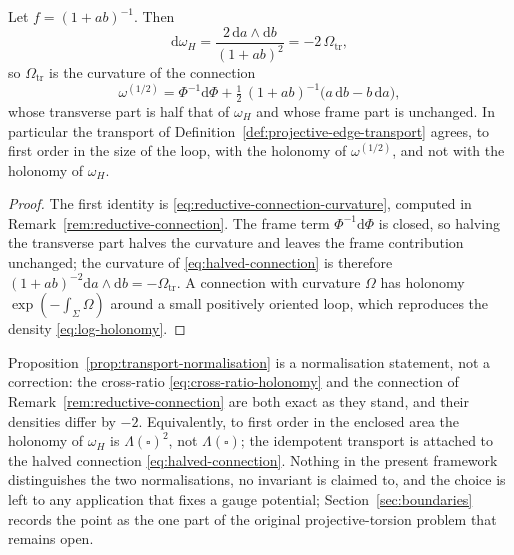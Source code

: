 \begin{proposition}
\label{prop:transport-normalisation}
Let $f=(1+ab)^{-1}$.  Then
\begin{equation}\label{eq:connection-curvature}
  \mathrm d\omega_H
  =\frac{2\,\mathrm da\wedge\mathrm db}{(1+ab)^{2}}
  =-2\,\Omega_{\mathrm{tr}} ,
\end{equation}
so $\Omega_{\mathrm{tr}}$ is the curvature of the connection
\begin{equation}\label{eq:halved-connection}
  \omega^{(1/2)}=\Phi^{-1}\mathrm d\Phi+\tfrac12\,(1+ab)^{-1}
  \bigl(a\,\mathrm db-b\,\mathrm da\bigr),
\end{equation}
whose transverse part is half that of $\omega_H$ and whose frame part is
unchanged.  In particular the transport of
Definition~\ref{def:projective-edge-transport} agrees, to first order in the
size of the loop, with the holonomy of $\omega^{(1/2)}$, and not with the
holonomy of $\omega_H$.
\end{proposition}

\begin{proof}
The first identity is \eqref{eq:reductive-connection-curvature}, computed in
Remark~\ref{rem:reductive-connection}.  The frame term $\Phi^{-1}\mathrm d\Phi$
is closed, so halving the transverse part halves the curvature and leaves the
frame contribution unchanged; the curvature of \eqref{eq:halved-connection} is
therefore $(1+ab)^{-2}\mathrm da\wedge\mathrm db=-\Omega_{\mathrm{tr}}$.  A
connection with curvature $\Omega$ has holonomy $\exp(-\int_\Sigma\Omega)$
around a small positively oriented loop, which reproduces the density
\eqref{eq:log-holonomy}.
\end{proof}

\begin{remark}
\label{rem:transport-density-boundary}
Proposition~\ref{prop:transport-normalisation} is a normalisation statement, not
a correction: the cross-ratio \eqref{eq:cross-ratio-holonomy} and the connection
of Remark~\ref{rem:reductive-connection} are both exact as they stand, and their
densities differ by $-2$.  Equivalently, to first order in the enclosed area the
holonomy of $\omega_H$ is $\Lambda(\square)^{2}$, not $\Lambda(\square)$; the
idempotent transport is attached to the halved connection
\eqref{eq:halved-connection}.  Nothing in the present framework distinguishes the
two normalisations, no invariant is claimed to, and the choice is left to any
application that fixes a gauge potential; Section~\ref{sec:boundaries} records
the point as the one part of the original projective-torsion problem that
remains open.
\end{remark}

